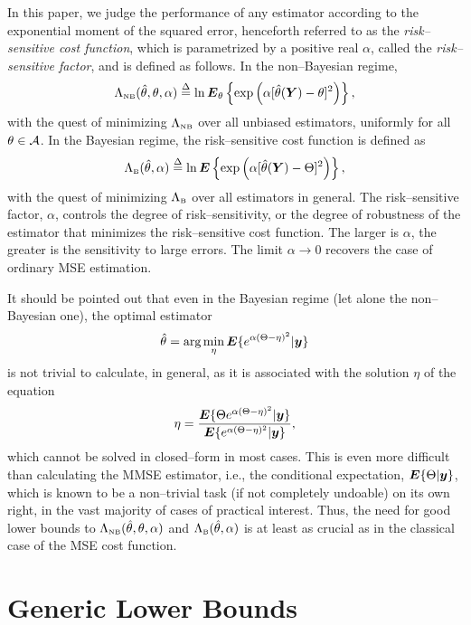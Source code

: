 \documentclass[11pt,epsf]{article}
\newcommand {\dfn} {\stackrel{\Delta} {=}}
\newcommand{\ct}{\hat{\theta}}
\newcommand {\by} {\mbox{\boldmath $y$}}
\newcommand {\bE} {\mbox{\boldmath $E$}}
\newcommand {\bY} {\mbox{\boldmath $Y$}}
\newcommand{\calA}{{\cal A}}
\begin{document}
In this paper, we judge the performance of 
any estimator according to the exponential moment of the squared error, henceforth
referred to as the {\it risk--sensitive cost function}, which is parametrized
by a positive real $\alpha$, called the {\it risk--sensitive factor}, and is
defined as follows.
In the non--Bayesian
regime, 
\begin{equation}
\Lambda_{\mbox{\tiny NB}}
(\ct,\theta,\alpha)\dfn \ln \bE_\theta\left\{\exp\left(\alpha
[\ct(\bY)-\theta]^2\right)\right\},
\end{equation}
with the quest of minimizing $\Lambda_{\mbox{\tiny NB}}$ over all unbiased
estimators, uniformly for all $\theta\in\calA$.
In the Bayesian regime, the risk--sensitive cost function is defined as
\begin{equation}
\Lambda_{\mbox{\tiny B}}(\ct,\alpha)\dfn \ln \bE\left\{\exp\left(\alpha
[\ct(\bY)-\Theta]^2\right)\right\},
\end{equation}
with the quest of minimizing $\Lambda_{\mbox{\tiny B}}$ over all
estimators in general. 
The risk--sensitive factor, $\alpha$, controls the degree of
risk--sensitivity, or the degree of robustness of the estimator that minimizes
the risk--sensitive cost function. The larger is $\alpha$, the greater is the
sensitivity to large errors. The limit $\alpha\to 0$ recovers the case of ordinary 
MSE estimation.

It should be pointed out that even in the Bayesian regime (let alone the
non--Bayesian one), the optimal estimator 
\begin{equation}
\ct=\mbox{arg}\min_\eta
\bE\{e^{\alpha(\Theta-\eta)^2}|\by\}
\end{equation}
is not trivial to calculate, in general, as it is
associated with the solution $\eta$ of the equation
\begin{equation}
\eta=\frac{\bE\{\Theta e^{\alpha(\Theta-\eta)^2}|\by\}}
{\bE\{e^{\alpha(\Theta-\eta)^2}|\by\}},
\end{equation}
which cannot be solved in closed--form in most cases.
This is even more difficult than calculating the MMSE estimator, i.e., the
conditional expectation,
$\bE\{\Theta|\by\}$, which is known to be a non--trivial task (if not
completely undoable) on its own
right, in the vast majority of cases of practical interest.
Thus, the need for good lower bounds to $\Lambda_{\mbox{\tiny
NB}}(\ct,\theta,\alpha)$ and
$\Lambda_{\mbox{\tiny B}}(\ct,\alpha)$ is at least as crucial as in the
classical case of the MSE cost function.

\section{Generic Lower Bounds}
\end{document}
